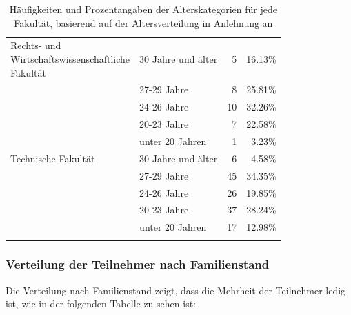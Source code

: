\documentclass[german,report]{i1thesis}
\begin{document}
\begin{longtable}{|p{5.95cm}|l|r|r|}
\makecell[l]{Rechts- und \\ Wirtschaftswissenschaftliche \\ Fakultät} & 30 Jahre und älter & 5  & 16.13\% \\ \cline{2-4}
                                                & 27-29 Jahre        & 8  & 25.81\% \\ \cline{2-4}
                                                & 24-26 Jahre        & 10 & 32.26\% \\ \cline{2-4}
                                                & 20-23 Jahre        & 7  & 22.58\% \\ \cline{2-4}
                                                & unter 20 Jahren    & 1  & 3.23\% \\ \hline
Technische Fakultät                             & 30 Jahre und älter & 6  & 4.58\% \\ \cline{2-4}
                                                & 27-29 Jahre        & 45 & 34.35\% \\ \cline{2-4}
                                                & 24-26 Jahre        & 26 & 19.85\% \\ \cline{2-4}
                                                & 20-23 Jahre        & 37 & 28.24\% \\ \cline{2-4}
                                                & unter 20 Jahren    & 17 & 12.98\% \\ \hline
\caption{Häufigkeiten und Prozentangaben der Alterskategorien für jede Fakultät, basierend auf der Altersverteilung in Anlehnung an \cite{rathmann2014alter}}
\end{longtable}

\subsubsection{Verteilung der Teilnehmer nach Familienstand}
Die Verteilung nach Familienstand zeigt, dass die Mehrheit der Teilnehmer ledig ist, wie in der folgenden Tabelle zu sehen ist:
\end{document}

